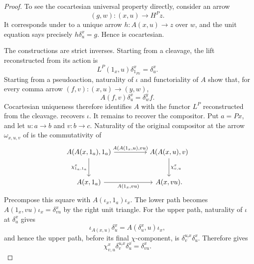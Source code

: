 \documentclass[11pt]{article}
\theoremstyle{plain}
\theoremstyle{definition}
\theoremstyle{remark}
\numberwithin{equation}{section}
\begin{document}
\begin{proof}
To see the cocartesian universal property directly, consider an arrow
\begin{equation*}
  (g,w)\colon(x,u)\longrightarrow H^Pz.
\end{equation*}
It corresponds under
 to a unique arrow
$h\colon A(x,u)\to z$ over $w$, and the unit equation says precisely
$h\delta^x_u=g$.  Hence  is
cocartesian.

The constructions are strict inverses.  Starting from a cleavage, the
lift reconstructed from its action is
\begin{equation*}
  L^P(1_x,u)\delta^x_{1_{Px}}=\delta^x_u.
\end{equation*}
Starting from a pseudoaction, naturality of $\iota$ and functoriality of
$A$ show that, for every comma arrow $(f,v)\colon(x,u)\to(y,w)$,
\begin{equation*}
  A(f,v)\delta^x_u=\delta^y_wf.
\end{equation*}
Cocartesian uniqueness therefore identifies $A$ with the functor $L^P$
reconstructed from the cleavage.  
recovers $\iota$.  It remains to recover the compositor.  Put
$a=Px$, and let $u\colon a\to b$ and $v\colon b\to c$.  Naturality of
the original compositor at the arrow $\omega_{x,u,v}$ of
 is the commutativity of
\begin{equation}
\begin{tikzcd}[column sep=huge,row sep=large]
A(A(x,1_a),1_a)
  \arrow[r,"{A(A(1_x,u),vu)}"]
  \arrow[d,"{\chi^x_{1_a,1_a}}"']
& A(A(x,u),v)
  \arrow[d,"{\chi^x_{v,u}}"] \\
A(x,1_a)
  \arrow[r,"{A(1_x,vu)}"']
& A(x,vu).
\end{tikzcd}
\label{eq:fixed-base-compositor-naturality}
\end{equation}
Precompose this square with
$A(\iota_x,1_a)\iota_x$.  The lower path becomes
$A(1_x,vu)\iota_x=\delta^x_{vu}$ by the right unit triangle.
For the upper path, naturality of $\iota$ at $\delta^x_u$ gives
\begin{equation*}
  \iota_{A(x,u)}\delta^x_u
  =A(\delta^x_u,u)\iota_x,
\end{equation*}
and hence the upper path, before its final $\chi$-component, is
$\delta^{u_!x}_v\delta^x_u$.  Therefore
 gives
\begin{equation}
  \chi^x_{v,u}\delta^{u_!x}_v\delta^x_u=\delta^x_{vu}.
  \label{eq:fixed-base-recover-compositor}

\end{equation}
\end{proof}
\end{document}
